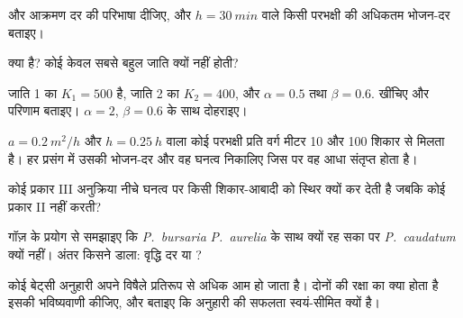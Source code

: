 \begin{exercise}[$\star$]\label{exo:b1:species-interactions:3}
 और आक्रमण दर की परिभाषा दीजिए, और $h = \qty{30}{min}$ वाले
किसी परभक्षी की अधिकतम भोजन-दर बताइए।
\end{exercise}

\begin{exercise}[$\star$]\label{exo:b1:species-interactions:4}
 क्या है? कोई  केवल सबसे बहुल जाति क्यों नहीं होती?
\end{exercise}

\begin{exercise}[$\star\star$]\label{exo:b1:species-interactions:5}
जाति 1 का $K_1 = 500$ है, जाति 2 का $K_2 = 400$, और $\alpha =
0.5$ तथा $\beta = 0.6$.  खींचिए और परिणाम बताइए।
$\alpha = 2$, $\beta = 0.6$ के साथ दोहराइए।
\end{exercise}

\begin{exercise}[$\star\star$]\label{exo:b1:species-interactions:6}
$a = \qty{0.2}{m^2/h}$ और $h = \qty{0.25}{h}$ वाला कोई परभक्षी प्रति वर्ग
मीटर \qty{10}{} और \qty{100}{} शिकार से मिलता है। हर प्रसंग में उसकी
भोजन-दर और वह घनत्व निकालिए जिस पर वह आधा संतृप्त होता है।
\end{exercise}

\begin{exercise}[$\star\star$]\label{exo:b1:species-interactions:7}
कोई प्रकार III अनुक्रिया नीचे घनत्व पर किसी शिकार-आबादी को स्थिर क्यों
कर देती है जबकि कोई प्रकार II नहीं करती?
\end{exercise}

\begin{exercise}[$\star\star$]\label{exo:b1:species-interactions:8}
गॉज़ के प्रयोग से समझाइए कि \emph{P.~bursaria} \emph{P.~aurelia} के साथ
क्यों रह सका पर \emph{P.~caudatum} क्यों नहीं। अंतर किसने डाला: वृद्धि
दर या ?
\end{exercise}

\begin{exercise}[$\star\star$]\label{exo:b1:species-interactions:9}
कोई बेट्सी अनुहारी अपने विषैले प्रतिरूप से अधिक आम हो जाता है। दोनों की
रक्षा का क्या होता है इसकी भविष्यवाणी कीजिए, और बताइए कि अनुहारी की
सफलता स्वयं-सीमित क्यों है।
\end{exercise}

